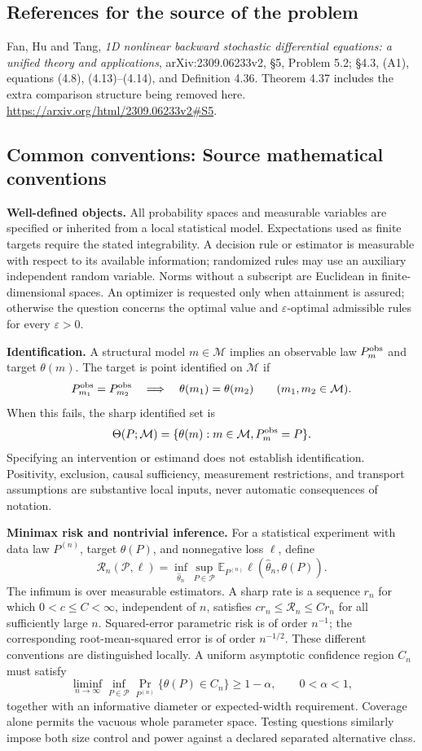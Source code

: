 \documentclass[11pt,a4paper]{article}
\newcommand{\E}{\mathbb E}
\begin{document}
\subsection*{References for the source of the problem}
Fan, Hu and Tang, \emph{1D nonlinear backward stochastic differential
equations: a unified theory and applications}, arXiv:2309.06233v2,
\S5, Problem 5.2; \S4.3, (A1), equations (4.8), (4.13)--(4.14), and
Definition 4.36. Theorem 4.37 includes the extra comparison structure
being removed here. \url{https://arxiv.org/html/2309.06233v2#S5}.

\subsection*{Common conventions: Source mathematical conventions}

\textbf{Well-defined objects.}
All probability spaces and measurable variables are specified or inherited
from a local statistical model. Expectations used as finite targets require
the stated integrability. A decision rule or estimator is measurable with
respect to its available information; randomized rules may use an auxiliary
independent random variable. Norms without a subscript are Euclidean in
finite-dimensional spaces. An optimizer is requested only when attainment
is assured; otherwise the question concerns the optimal value and
$\varepsilon$-optimal admissible rules for every $\varepsilon>0$.

\textbf{Identification.}
A structural model $m\in\mathcal M$ implies an observable law
$P_m^{\rm obs}$ and target $\theta(m)$. The target is point identified on
$\mathcal M$ if
\[
 P_{m_1}^{\rm obs}=P_{m_2}^{\rm obs}
 \quad\Longrightarrow\quad\theta(m_1)=\theta(m_2)
 \qquad(m_1,m_2\in\mathcal M).
\]
When this fails, the sharp identified set is
\[
 \Theta(P;\mathcal M)=\{\theta(m):m\in\mathcal M,
                                  P_m^{\rm obs}=P\}.
\]
Specifying an intervention or estimand does not establish identification.
Positivity, exclusion, causal sufficiency, measurement restrictions, and
transport assumptions are substantive local inputs, never automatic
consequences of notation.

\textbf{Minimax risk and nontrivial inference.}
For a statistical experiment with data law $P^{(n)}$, target $\theta(P)$,
and nonnegative loss $\ell$, define
\[
 \mathcal R_n(\mathcal P,\ell)
   =\inf_{\widehat\theta_n}\sup_{P\in\mathcal P}
      \E_{P^{(n)}}\ell(\widehat\theta_n,\theta(P)).
\]
The infimum is over measurable estimators. A sharp rate is a sequence
$r_n$ for which $0<c\leq C<\infty$, independent of $n$, satisfies
$c r_n\leq\mathcal R_n\leq C r_n$ for all sufficiently large $n$.
Squared-error parametric risk is of order $n^{-1}$; the corresponding
root-mean-squared error is of order $n^{-1/2}$. These different conventions
are distinguished locally. A uniform asymptotic confidence region $C_n$
must satisfy
\[
 \liminf_{n\to\infty}\inf_{P\in\mathcal P}
     \Pr_{P^{(n)}}\{\theta(P)\in C_n\}\geq 1-\alpha,
 \qquad 0<\alpha<1,
\]
together with an informative diameter or expected-width requirement.
Coverage alone permits the vacuous whole parameter space. Testing questions
similarly impose both size control and power against a declared separated
alternative class.
\end{document}

